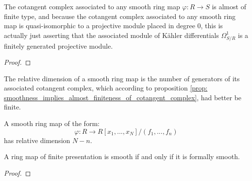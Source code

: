             \begin{proposition} \label{prop: smoothness_implies_almost_finiteness_of_cotangent_complex}
                The cotangent complex associated to any smooth ring map $\varphi: R \to S$ is almost of finite type, and because the cotangent complex associated to any smooth ring map is quasi-isomorphic to a projective module placed in degree $0$, this is actually just asserting that the associated module of K\"ahler differentials $\Omega^1_{S/R}$ is a finitely generated projective module.
            \end{proposition}
                \begin{proof}
                
                \end{proof}
            \begin{corollary}
                The relative dimension of a smooth ring map is the number of generators of its associated cotangent complex, which according to proposition \ref{prop: smoothness_implies_almost_finiteness_of_cotangent_complex}, had better be finite.
            \end{corollary}
            \begin{example}
                A smooth ring map of the form:
                    $$\varphi: R \to R[x_1, ..., x_N]/(f_1, ..., f_n)$$
                has relative dimension $N - n$. 
            \end{example}
            
            \begin{proposition} \label{prop: smooth_iff_formally_smooth_and_of_finite_presentation}
                A ring map of finite presentation is smooth if and only if it is formally smooth.
            \end{proposition}
                \begin{proof}
                    
                \end{proof}
            
